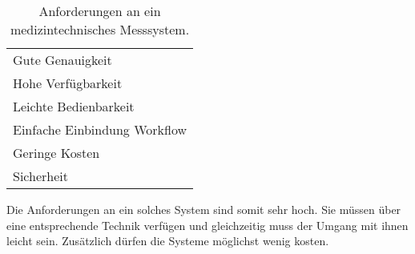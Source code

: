 \begin{table} [H]
	\begin{center}
		\begin{tabular}{l}
		Gute Genauigkeit\\
		Hohe Verfügbarkeit\\
		Leichte Bedienbarkeit\\
		Einfache Einbindung Workflow\\
		Geringe Kosten\\
		Sicherheit\\
		\end{tabular}
	\end{center}
	\caption[Anforderungen Trackingsysteme]{Anforderungen an ein medizintechnisches Messsystem.}
	\label{tab:requirements_system}
\end{table}
%
Die Anforderungen an ein solches System sind somit sehr hoch. Sie müssen über eine entsprechende Technik verfügen und gleichzeitig muss der Umgang mit ihnen leicht sein. Zusätzlich dürfen die Systeme möglichst wenig kosten.\\
%
